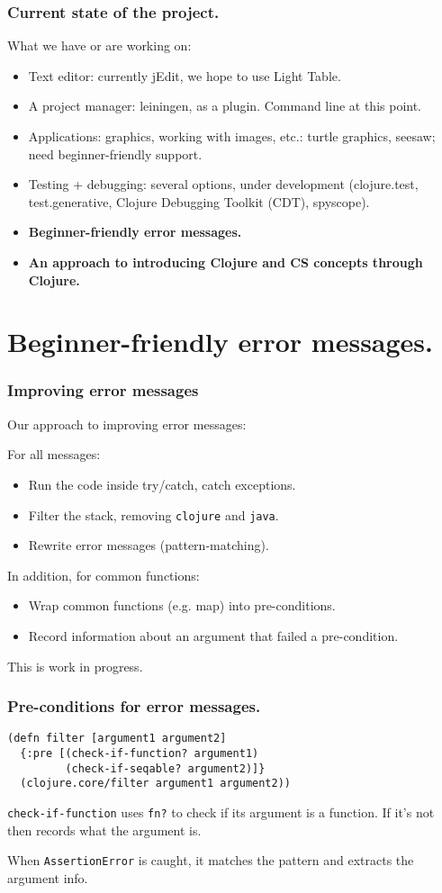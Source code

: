 \documentclass{beamer}
\begin{document}
\begin{frame}
  \frametitle{Current state of the project.}
What we have or are working on:
\begin{itemize}
\item Text editor: currently jEdit, we hope to use Light Table. 
\item A project manager: leiningen, as a plugin. Command line at this point. 
\item Applications: graphics, working with images, etc.: turtle graphics, seesaw; need beginner-friendly support.
\item Testing + debugging: several options, under development (clojure.test, test.generative, Clojure Debugging Toolkit (CDT), spyscope).
\item{\bf  Beginner-friendly error messages.}
\item {\bf An approach to introducing Clojure and CS concepts through Clojure. }
\end{itemize}
\end{frame}

\section{Beginner-friendly error messages.}

\begin{frame}
  \frametitle{Improving error messages}
Our approach to improving error messages:

For all messages:
\begin{itemize}
\item Run the code inside try/catch, catch exceptions. 
\item Filter the stack, removing {\tt clojure} and {\tt java}. 
\item Rewrite error messages (pattern-matching). 
\end{itemize}

In addition, for common functions:
\begin{itemize}
\item Wrap common functions (e.g. map) into pre-conditions. 
\item Record information about an argument that failed a pre-condition.
\end{itemize}
This is work in progress. 
\end{frame}

\begin{frame}[fragile]
  \frametitle{Pre-conditions for error messages.}
\begin{verbatim}
(defn filter [argument1 argument2]
  {:pre [(check-if-function? argument1) 
         (check-if-seqable? argument2)]}
  (clojure.core/filter argument1 argument2))
\end{verbatim}
{\tt check-if-function} uses {\tt fn?} to check if its argument is a function. 
If it's not then records what the argument is. 

When {\tt AssertionError} is caught, it matches the pattern and extracts the argument info. 
\end{frame}
\end{document}
